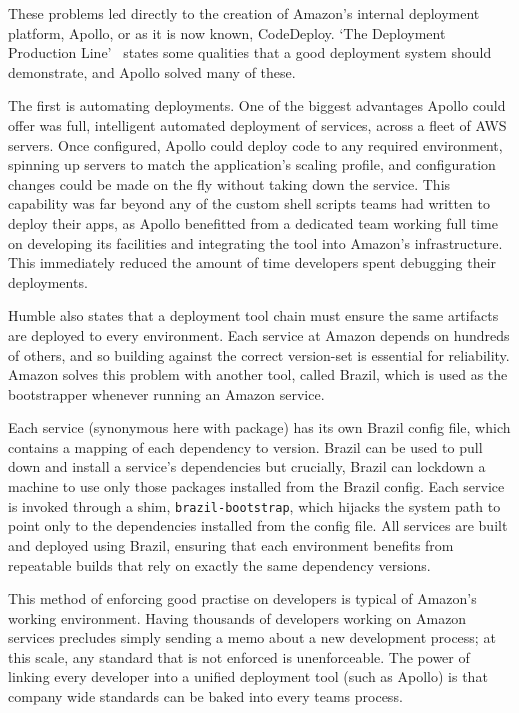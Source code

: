 \documentclass[11pt]{article}
\begin{document}
These problems led directly to the creation of Amazon's internal deployment
platform, Apollo, or as it is now known, CodeDeploy. `The Deployment Production
Line'~\cite{deploymentProductionLine} states some qualities that a good
deployment system should demonstrate, and Apollo solved many of these.

The first is automating deployments. One of the biggest advantages Apollo could
offer was full, intelligent automated deployment of services, across a fleet of
AWS servers. Once configured, Apollo could deploy code to any required
environment, spinning up servers to match the application's scaling profile, and
configuration changes could be made on the fly without taking down the service.
This capability was far beyond any of the custom shell scripts teams had written
to deploy their apps, as Apollo benefitted from a dedicated team working full
time on developing its facilities and integrating the tool into Amazon's
infrastructure. This immediately reduced the amount of time developers spent
debugging their deployments.

Humble also states that a deployment tool chain must ensure the same artifacts
are deployed to every environment. Each service at Amazon depends on hundreds of
others, and so building against the correct version-set is essential for
reliability. Amazon solves this problem with another tool, called Brazil, which
is used as the bootstrapper whenever running an Amazon service.

Each service (synonymous here with package) has its own Brazil config file,
which contains a mapping of each dependency to version. Brazil can be used to
pull down and install a service's dependencies but crucially, Brazil can
lockdown a machine to use only those packages installed from the Brazil config.
Each service is invoked through a shim, \texttt{brazil-bootstrap}, which hijacks
the system path to point only to the dependencies installed from the config
file.  All services are built and deployed using Brazil, ensuring that each
environment benefits from repeatable builds that rely on exactly the same
dependency versions.

This method of enforcing good practise on developers is typical of Amazon's
working environment. Having thousands of developers working on Amazon services
precludes simply sending a memo about a new development process; at this scale,
any standard that is not enforced is unenforceable. The power of linking every
developer into a unified deployment tool (such as Apollo) is that company wide
standards can be baked into every teams process.
\end{document}
